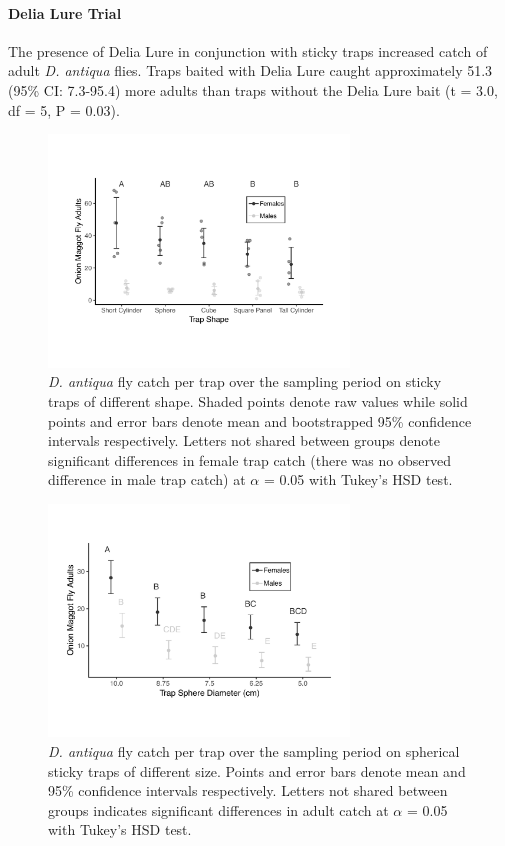 \documentclass[alpha-refs]{wiley-article}
\begin{document}
\paragraph{Delia Lure Trial} The presence of Delia Lure in conjunction with sticky traps increased catch of adult \textit{D. antiqua} flies.  Traps baited with Delia Lure caught approximately 51.3 (95\% CI: 7.3-95.4) more adults than traps without the Delia Lure bait (t = 3.0, df = 5, P = 0.03).




\begin{figure}[bt]
\centering
\includegraphics[width = 8cm]{figures/publication/figure-1.pdf}
\caption{\textit{D. antiqua} fly catch per trap over the sampling period on sticky traps of different shape.  Shaded points denote raw values while solid points and error bars denote mean and bootstrapped 95\% confidence intervals respectively.  Letters not shared between groups denote significant differences in female trap catch (there was no observed difference in male trap catch) at $\alpha$ = 0.05 with Tukey's HSD test. }
\label{fig:figure1}
\end{figure}

\begin{figure}[bt]
\centering
\includegraphics[width = 8cm]{figures/publication/figure-2.pdf}
\caption{\textit{D. antiqua} fly catch per trap over the sampling period on spherical sticky traps of different size.  Points and error bars denote mean and 95\% confidence intervals respectively.  Letters not shared between groups indicates significant differences in adult catch at $\alpha$ = 0.05 with Tukey's HSD test.}
\label{fig:figure2}
\end{figure}
\end{document}
